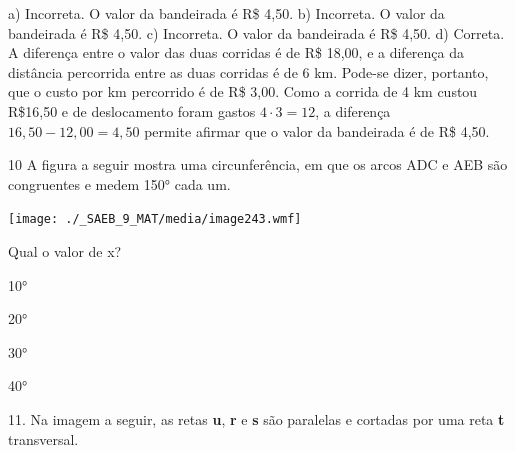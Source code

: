 \begin{escolha}
\begin{escolha}
\begin{escolha}
\begin{escolha}
{\begin{boxmedio}
\begin{boxpeq}
\begin{q°}
\begin{boxmedio}
\begin{boxpeq}
\begin{boxpeq}
\begin{boxmedio}
\begin{boxmedio}
\begin{boxmedio}
\begin{largebox}
\begin{boxmedio}
{\begin{enumerate}
\begin{boxpeq}
{\begin{boxpeq}
\begin{boxpeq}
\begin{boxmedio}
\begin{boxpeq}
\begin{boxpeq}
\begin{boxpeq}
\begin{escolha}
\begin{escolha}
{a) Incorreta. O valor da bandeirada é R\$ 4,50.
b) Incorreta. O valor da bandeirada é R\$ 4,50.
c) Incorreta. O valor da bandeirada é R\$ 4,50.
d) Correta. A diferença entre o valor das duas corridas é de R\$ 18,00, 
e a diferença da distância percorrida entre as duas corridas é de 6 km. 
Pode-se dizer, portanto, que o custo por km percorrido é de R\$ 3,00. Como a
corrida de 4 km custou R\$16,50 e de deslocamento foram gastos $4 \cdot 3 = 12$,
a diferença $16,50 - 12,00 = 4,50$ permite afirmar que o valor da bandeirada é 
de R\$ 4,50.}

\num{10} A figura a seguir mostra uma circunferência, em que os arcos ADC e
AEB são congruentes e medem 150° cada um.

\texttt{[image: ./\_SAEB\_9\_MAT/media/image243.wmf]}


Qual o valor de x?

\begin{escolha}
  
  \item 10°

  \item 20°

  \item 30° 
  
  \item 40° 

\end{escolha}


11. Na imagem a seguir, as retas \textbf{u}, \textbf{r} e \textbf{s} são paralelas
e cortadas por uma reta \textbf{t} transversal.


\end{escolha}
\end{escolha}
\end{boxpeq}
\end{boxpeq}
\end{boxpeq}
\end{boxmedio}
\end{boxpeq}
\end{boxpeq}}
\end{boxpeq}
\end{enumerate}}
\end{boxmedio}
\end{largebox}
\end{boxmedio}
\end{boxmedio}
\end{boxmedio}
\end{boxpeq}
\end{boxpeq}
\end{boxmedio}
\end{q°}
\end{boxpeq}
\end{boxmedio}}
\end{escolha}
\end{escolha}
\end{escolha}
\end{escolha}
